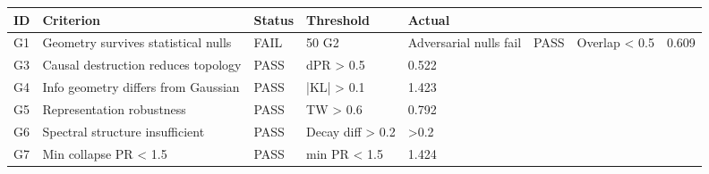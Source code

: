 \begin{tabular}{lllll}
\toprule
ID & Criterion & Status & Threshold & Actual \\
\midrule
G1 & Geometry survives statistical nulls & FAIL & 50%
G2 & Adversarial nulls fail & PASS & Overlap < 0.5 & 0.609 \\
G3 & Causal destruction reduces topology & PASS & dPR > 0.5 & 0.522 \\
G4 & Info geometry differs from Gaussian & PASS & |KL| > 0.1 & 1.423 \\
G5 & Representation robustness & PASS & TW > 0.6 & 0.792 \\
G6 & Spectral structure insufficient & PASS & Decay diff > 0.2 & >0.2 \\
G7 & Min collapse PR < 1.5 & PASS & min PR < 1.5 & 1.424 \\
\bottomrule
\end{tabular}
